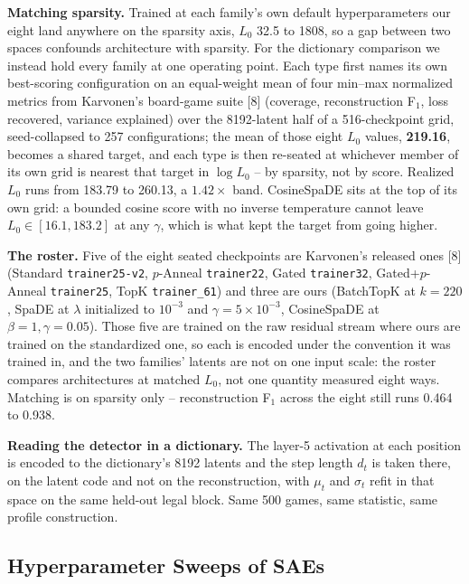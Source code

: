 \textbf{Matching sparsity.} Trained at each family's own default hyperparameters our eight land anywhere on the sparsity
axis, $L_0$ 32.5 to 1808, so a gap between two spaces confounds
architecture with sparsity. For the dictionary comparison we instead hold every family at one
operating point. Each type first names its own best-scoring configuration on an equal-weight mean
of four min--max normalized metrics from Karvonen's board-game suite [8] (coverage,
reconstruction F$_1$, loss recovered, variance explained) over the 8192-latent half of a 516-checkpoint grid, seed-collapsed to 257
configurations; the mean of those
eight $L_0$ values, \textbf{219.16}, becomes a shared target, and each type is then re-seated at
whichever member of its own grid is nearest that target in $\log L_0$ -- by sparsity, not by
score. Realized $L_0$ runs from 183.79 to 260.13, a $1.42\times$ band. CosineSpaDE sits at the top of its own grid: a bounded cosine score with no inverse
temperature cannot leave $L_0 \in [16.1, 183.2]$ at any $\gamma$, which is what kept the target
from going higher.

\textbf{The roster.} Five of the eight seated checkpoints are Karvonen's released ones [8] (Standard \texttt{trainer25-v2}, $p$-Anneal \texttt{trainer22},
Gated \texttt{trainer32}, Gated+$p$-Anneal \texttt{trainer25}, TopK \texttt{trainer\_61}) and
three are ours (BatchTopK at $k = 220$, SpaDE at $\lambda$ initialized to $10^{-3}$ and
$\gamma = 5\times10^{-3}$,
CosineSpaDE at $\beta = 1, \gamma = 0.05$). Those five are trained on the raw residual stream
where ours are trained on the standardized one, so each is encoded under the convention it was trained
in, and the two families' latents are not on one input scale: the roster compares architectures
at matched $L_0$, not one quantity measured eight ways. Matching is on sparsity only --
reconstruction F$_1$ across the eight still runs 0.464 to 0.938.

\textbf{Reading the detector in a dictionary.} The layer-5 activation at each position is encoded
to the dictionary's 8192 latents and the step length $d_t$ is taken there, on the latent
code and not on the reconstruction, with $\mu_t$ and $\sigma_t$ refit in that space on the
same held-out legal block. Same 500 games, same statistic, same profile construction.

\subsection{Hyperparameter Sweeps of SAEs}

